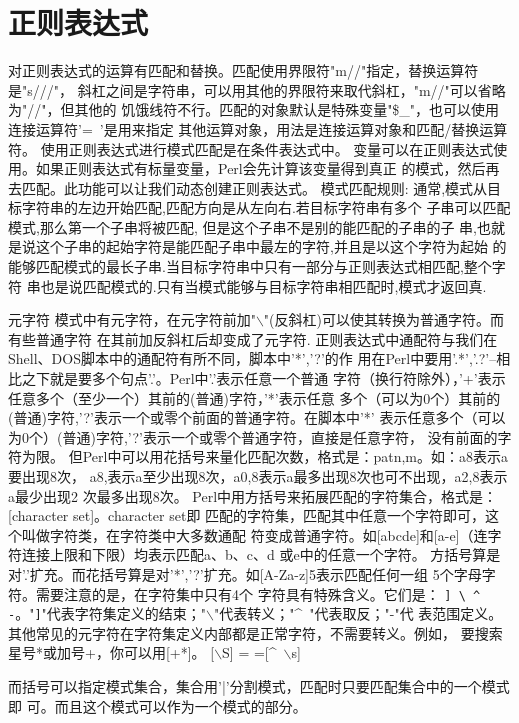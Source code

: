 \documentclass[a4paper,11pt]{book}
\begin{document}
\section{正则表达式}
对正则表达式的运算有匹配和替换。匹配使用界限符"m//"指定，替换运算符是"s///"，
斜杠之间是字符串，可以用其他的界限符来取代斜杠，"m//"可以省略为"//"，但其他的
饥饿线符不行。匹配的对象默认是特殊变量"\$_"，也可以使用连接运算符'=~'是用来指定
其他运算对象，用法是连接运算对象和匹配/替换运算符。
使用正则表达式进行模式匹配是在条件表达式中。
变量可以在正则表达式使用。如果正则表达式有标量变量，Perl会先计算该变量得到真正
的模式，然后再去匹配。此功能可以让我们动态创建正则表达式。
模式匹配规则:
		通常,模式从目标字符串的左边开始匹配,匹配方向是从左向右.若目标字符串有多个
子串可以匹配模式,那么第一个子串将被匹配, 但是这个子串不是别的能匹配的子串的子
串,也就是说这个子串的起始字符是能匹配子串中最左的字符,并且是以这个字符为起始
的能够匹配模式的最长子串.当目标字符串中只有一部分与正则表达式相匹配,整个字符
串也是说匹配模式的.只有当模式能够与目标字符串相匹配时,模式才返回真.
		
元字符
模式中有元字符，在元字符前加"$\backslash$"(反斜杠)可以使其转换为普通字符。而有些普通字符
在其前加反斜杠后却变成了元字符.
正则表达式中通配符与我们在Shell、DOS脚本中的通配符有所不同，脚本中'*','?'的作
用在Perl中要用'.*','.?'--相比之下就是要多个句点'.'。Perl中'.'表示任意一个普通
字符（换行符除外），'+'表示任意多个（至少一个）其前的(普通)字符，'*'表示任意
多个（可以为0个）其前的(普通)字符,'?'表示一个或零个前面的普通字符。在脚本中'*'
表示任意多个（可以为0个）(普通)字符,'?'表示一个或零个普通字符，直接是任意字符，
没有前面的字符为限。
但Perl中可以用花括号来量化匹配次数，格式是：pat{n,m}。如：a{8}表示a要出现8次，
a{8,}表示a至少出现8次，a{0,8}表示a最多出现8次也可不出现，a{2,8}表示a最少出现2
次最多出现8次。
Perl中用方括号来拓展匹配的字符集合，格式是：[character set]。character set即
匹配的字符集，匹配其中任意一个字符即可，这个叫做字符类，在字符类中大多数通配
符变成普通字符。如[abcde]和[a-e]（连字符连接上限和下限）均表示匹配a、b、c、d
或e中的任意一个字符。
方括号算是对'.'扩充。而花括号算是对'*','?'扩充。如[A-Za-z]{5}表示匹配任何一组
5个字母字符。需要注意的是，在字符集中只有4个 字符具有特殊含义。它们是：
\verb|] \ ^ -|。"\verb|]|"代表字符集定义的结束；"$\backslash$"代表转义；"\^~"代表取反；"-"代
表范围定义。其他常见的元字符在字符集定义内部都是正常字符，不需要转义。例如，
要搜索星号*或加号+，你可以用[+*]。
[$\backslash$S] = =[\^~$\backslash$s]

而括号可以指定模式集合，集合用'|'分割模式，匹配时只要匹配集合中的一个模式即
可。而且这个模式可以作为一个模式的部分。
\end{document}
